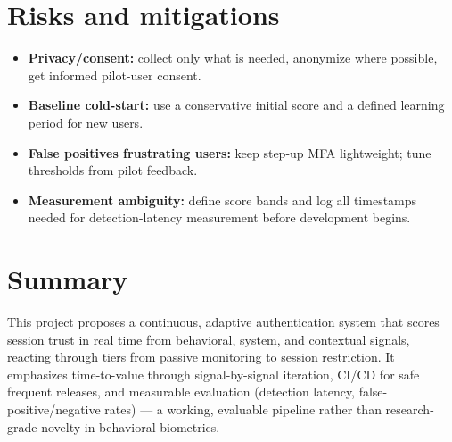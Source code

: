 \documentclass[11pt,a4paper]{article}
\begin{document}
\section{Risks and mitigations} 
\begin{itemize}[leftmargin=0.7cm] 
    \item \textbf{Privacy/consent:} collect only what is needed, anonymize where possible, get informed pilot-user consent. 
    \item \textbf{Baseline cold-start:} use a conservative initial score and a defined learning period for new users. 
    \item \textbf{False positives frustrating users:} keep step-up MFA lightweight; tune thresholds from pilot feedback. 
    \item \textbf{Measurement ambiguity:} define score bands and log all timestamps needed for detection-latency measurement before development begins. 
\end{itemize} 
 
\section{Summary} 
This project proposes a continuous, adaptive authentication system 
that scores session trust in real time from behavioral, system, and 
contextual signals, reacting through tiers from passive monitoring to 
session restriction. It emphasizes time-to-value through 
signal-by-signal iteration, CI/CD for safe frequent releases, and 
measurable evaluation (detection latency, false-positive/negative 
rates) --- a working, evaluable pipeline rather than research-grade 
novelty in behavioral biometrics. 
 
\end{document}
